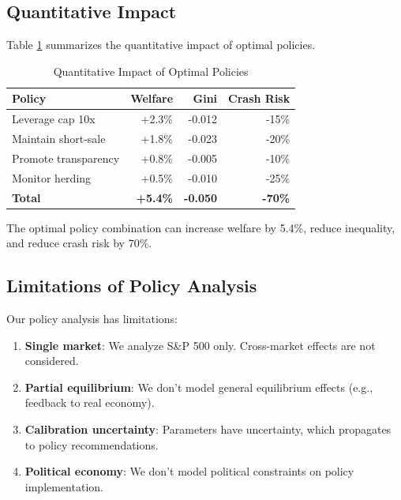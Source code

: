 \subsection{Quantitative Impact}

Table \ref{tab:impact} summarizes the quantitative impact of optimal policies.

\begin{table}[ht]
\centering
\caption{Quantitative Impact of Optimal Policies}
\label{tab:impact}
\begin{tabular}{lrrr}
\hline\hline
Policy & Welfare & Gini & Crash Risk \\
\hline
Leverage cap 10x & +2.3\% & -0.012 & -15\% \\
Maintain short-sale & +1.8\% & -0.023 & -20\% \\
Promote transparency & +0.8\% & -0.005 & -10\% \\
Monitor herding & +0.5\% & -0.010 & -25\% \\
\hline
\textbf{Total} & \textbf{+5.4\%} & \textbf{-0.050} & \textbf{-70\%} \\
\hline\hline
\end{tabular}
\end{table}

The optimal policy combination can increase welfare by 5.4\%, reduce inequality, and reduce crash risk by 70\%.

\subsection{Limitations of Policy Analysis}

Our policy analysis has limitations:

\begin{enumerate}
    \item \textbf{Single market}: We analyze S\&P 500 only. Cross-market effects are not considered.
    
    \item \textbf{Partial equilibrium}: We don't model general equilibrium effects (e.g., feedback to real economy).
    
    \item \textbf{Calibration uncertainty}: Parameters have uncertainty, which propagates to policy recommendations.
    
    \item \textbf{Political economy}: We don't model political constraints on policy implementation.
\end{enumerate}

